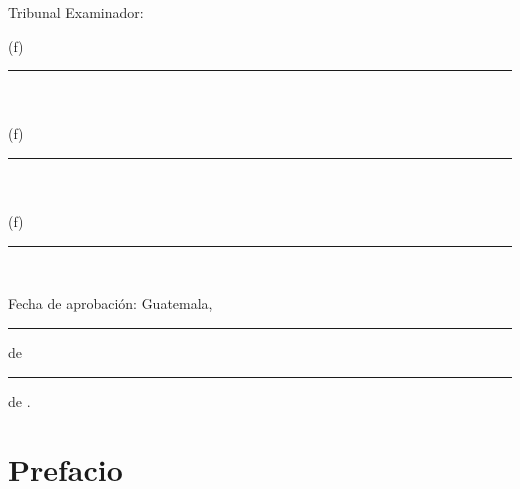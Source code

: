 \documentclass[11pt, letterpaper, twoside, openright]{report}
\newcommand{\defaultparformat}[1]{
	{\setlength{\parskip}{2ex}
     }
}
\begin{document}
	Tribunal Examinador:\\[1cm]
	\begin{center}
		(f) \rule[1pt]{4 in}{1pt}\\
		\nombreasesor \\[1in]
		(f) \rule[1pt]{4 in}{1pt}\\
		\nombreprimerex \\[1in]
		(f) \rule[1pt]{4 in}{1pt}\\
		\nombresegundoex
	\end{center}
	\vspace{1in}

	Fecha de aprobación: Guatemala, \rule[1pt]{0.5 in}{1pt} de \rule[1pt]{1 in}{1pt} de \anoaprobacion.
	\normalsize
\fi

\pagestyle{plain}
\ifdefined\CAPprefacio
	\newpage
	\cleardoublepage{}
    \chapter*{Prefacio}
    \ifdefined\parpordefecto
    	\defaultparformat{a-prefacio}
    \else
    	
    \fi
\fi

\ifdefined\CAPindice
	\newpage
    \cleardoublepage{}
	\renewcommand{\contentsname}{Índice}
    \pdfbookmark{\contentsname}{toc}
	\tableofcontents
\fi

\ifdefined\CAPfiguras
	\newpage
    \cleardoublepage{}
	\renewcommand{\listfigurename}{Lista de figuras}
	\listoffigures
\fi

\ifdefined\CAPcuadros
	\newpage
    \cleardoublepage{}
	\renewcommand{\listtablename}{Lista de cuadros}
	\listoftables
\fi
\end{document}
